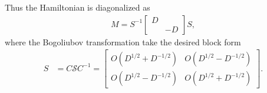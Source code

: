 Thus the Hamiltonian is diagonalized as
\begin{equation}\begin{aligned}
M=S^{-1}
\begin{bmatrix}
D \\
& -D
\end{bmatrix}
S,
\end{aligned}\end{equation}
where the Bogoliubov transformation take the desired block form
\begin{equation}\begin{aligned}
S&=C\mathcal{S}C^{-1}
=\begin{bmatrix}
O(D^{1/2}+D^{-1/2}) & O(D^{1/2}-D^{-1/2}) \\
O(D^{1/2}-D^{-1/2}) & O(D^{1/2}+D^{-1/2}) 
\end{bmatrix}.
\end{aligned}\end{equation}


